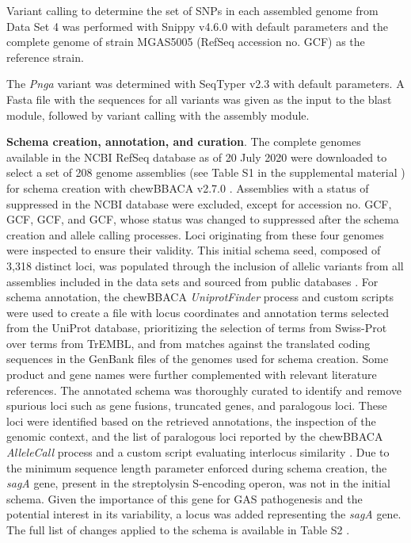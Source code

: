 Variant calling to determine the set of \ac{SNPs} in each assembled genome from Data Set 4 \cite{friaes_supplemental_2023} was performed with Snippy v4.6.0 \cite{noauthor_release_nodate-3} with default parameters and the complete genome of strain MGAS5005 (RefSeq accession no. GCF) as the reference strain.

The \textit{Pnga} variant was determined with SeqTyper v2.3 \cite{noauthor_b-ummiseq_typing_2025} with default parameters. A Fasta ﬁle with the sequences for all variants was given as the input to the blast module, followed by variant calling with the assembly module.

\textbf{Schema creation, annotation, and curation}. The complete genomes available in the \ac{NCBI} RefSeq database as of 20 July 2020 were downloaded to select a set of 208 genome assemblies (see Table S1 in the supplemental material \cite{friaes_supplemental_2023}) for schema creation with chewBBACA v2.7.0 \cite{silva_chewbbaca_2018}. Assemblies with a status of suppressed in the \ac{NCBI} database were excluded, except for accession no. GCF, GCF, GCF, and GCF, whose status was changed to suppressed after the schema creation and allele calling processes. Loci originating from these four genomes were inspected to ensure their validity. This initial schema seed, composed of 3,318 distinct loci, was populated through the inclusion of allelic variants from all assemblies included in the data sets and sourced from public databases \cite{blackwell_exploring_2021, oleary_reference_2016}. For schema annotation, the chewBBACA \textit{UniprotFinder} process and custom scripts \cite{noauthor_release_nodate-4} were used to create a ﬁle with locus coordinates and annotation terms selected from the UniProt database, prioritizing the selection of terms from Swiss-Prot over terms from TrEMBL, and from matches against the translated coding sequences in the GenBank ﬁles of the genomes used for schema creation. Some product and gene names were further complemented with relevant literature references. The annotated schema was thoroughly curated to identify and remove spurious loci such as gene fusions, truncated genes, and paralogous loci. These loci were identiﬁed based on the retrieved annotations, the inspection of the genomic context, and the list of paralogous loci reported by the chewBBACA \textit{AlleleCall} process and a custom script evaluating interlocus similarity \cite{noauthor_release_nodate-4}. Due to the minimum sequence length parameter enforced during schema creation, the \textit{sagA} gene, present in the streptolysin S-encoding operon, was not in the initial schema. Given the importance of this gene for \ac{GAS} pathogenesis and the potential interest in its variability, a locus was added representing the \textit{sagA} gene. The full list of changes applied to the schema is available in Table S2 \cite{friaes_supplemental_2023}.

